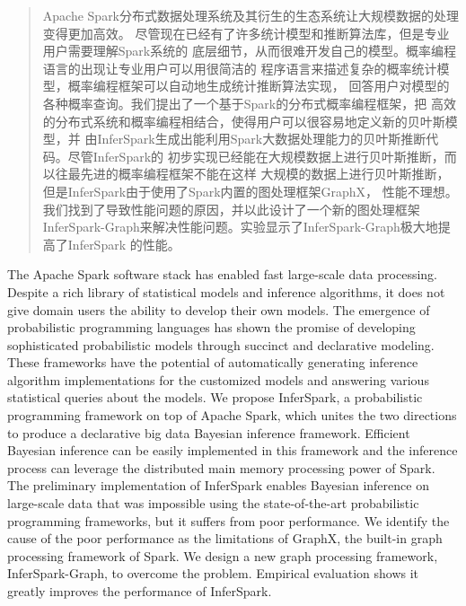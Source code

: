 \setlength\parindent{2em}
\begin{abstract}
	Apache Spark分布式数据处理系统及其衍生的生态系统让大规模数据的处理变得更加高效。
	尽管现在已经有了许多统计模型和推断算法库，但是专业用户需要理解Spark系统的
	底层细节，从而很难开发自己的模型。概率编程语言的出现让专业用户可以用很简洁的
	程序语言来描述复杂的概率统计模型，概率编程框架可以自动地生成统计推断算法实现，
	回答用户对模型的各种概率查询。我们提出了一个基于Spark的分布式概率编程框架，把
	高效的分布式系统和概率编程相结合，使得用户可以很容易地定义新的贝叶斯模型，并
	由InferSpark生成出能利用Spark大数据处理能力的贝叶斯推断代码。尽管InferSpark的
	初步实现已经能在大规模数据上进行贝叶斯推断，而以往最先进的概率编程框架不能在这样
	大规模的数据上进行贝叶斯推断，但是InferSpark由于使用了Spark内置的图处理框架GraphX，
	性能不理想。我们找到了导致性能问题的原因，并以此设计了一个新的图处理框架
	InferSpark-Graph来解决性能问题。实验显示了InferSpark-Graph极大地提高了InferSpark
	的性能。

\end{abstract}
\setlength\parindent{0pt}

\begin{englishabstract}
	
	The Apache Spark software stack has enabled fast large-scale data processing.
	Despite a rich library of statistical models and inference algorithms, it
	does not give domain users the ability to develop their own models. The
	emergence of probabilistic programming languages has shown the promise of
	developing sophisticated probabilistic models through succinct and
	declarative modeling. These frameworks have the potential of automatically
	generating inference algorithm implementations for the customized models and
	answering various statistical queries about the models.  We propose
	InferSpark, a probabilistic programming framework on top of Apache Spark,
	which unites the two directions to produce a declarative big data Bayesian
	inference framework. Efficient Bayesian inference can be easily implemented
	in this framework and the inference process can leverage the distributed main
	memory processing power of Spark.  The preliminary implementation of
	InferSpark enables Bayesian inference on large-scale data that was impossible
	using the state-of-the-art probabilistic programming frameworks, but it
	suffers from poor performance. We identify the cause of the
	poor performance as the limitations of GraphX, the built-in graph processing
	framework of Spark. We design a new graph processing framework,
	InferSpark-Graph, to overcome the problem. Empirical evaluation shows it
	greatly improves the performance of InferSpark.

\end{englishabstract}
